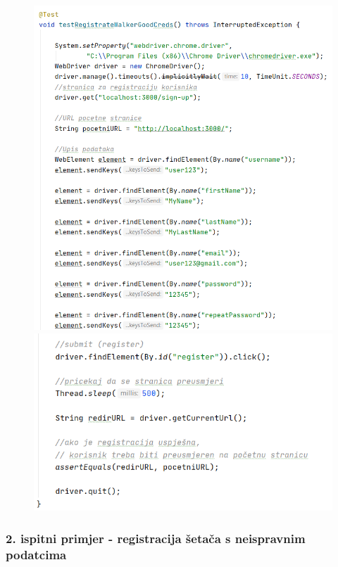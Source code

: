 			 	\begin{figure}[H]
			 	\includegraphics[scale=0.75]{slike/Selenium1.1.PNG}
			 	\hspace*{-0.85in}
			 	\includegraphics[scale=0.75]{slike/Selenium1.2.PNG} %
			 	\centering
			 \end{figure}
		 
		 
		 
		 \subsubsection{2. ispitni primjer - registracija šetača s neispravnim podatcima}
		 
